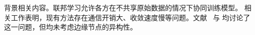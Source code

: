 背景相关内容。联邦学习允许各方在不共享原始数据的情况下协同训练模型\cite{mcmahan2017}。
相关工作表明，现有方法存在通信开销大、收敛速度慢等问题。文献~\cite{foo2020} 与 \cite{bar2021} 均讨论了这一问题，但均未考虑边缘节点的异构性。
